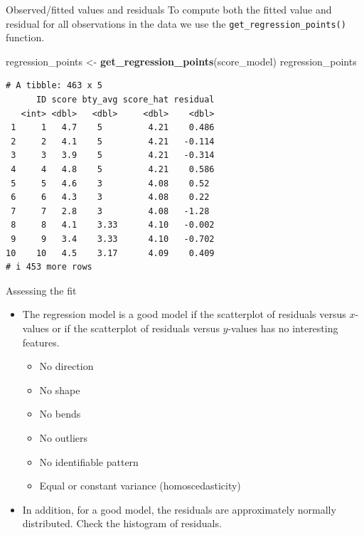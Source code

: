 \documentclass[
  ignorenonframetext,
]{beamer}
\newenvironment{Shaded}{\begin{snugshade}}{\end{snugshade}}
\newcommand{\FunctionTok}[1]{\textcolor[rgb]{0.13,0.29,0.53}{\textbf{#1}}}
\newcommand{\NormalTok}[1]{#1}
\newcommand{\OtherTok}[1]{\textcolor[rgb]{0.56,0.35,0.01}{#1}}
\providecommand{\tightlist}{%
  \setlength{\itemsep}{0pt}\setlength{\parskip}{0pt}}
\begin{document}
\begin{frame}[fragile]{Observed/fitted values and residuals}
\protect{}\label{observedfitted-values-and-residuals-2}
To compute both the fitted value and residual for all observations in
the data we use the \texttt{get\_regression\_points()} function.

\small

\begin{Shaded}
\begin{Highlighting}[]
\NormalTok{regression\_points }\OtherTok{\textless{}{-}} \FunctionTok{get\_regression\_points}\NormalTok{(score\_model)}
\NormalTok{regression\_points}
\end{Highlighting}
\end{Shaded}

\begin{verbatim}
# A tibble: 463 x 5
      ID score bty_avg score_hat residual
   <int> <dbl>   <dbl>     <dbl>    <dbl>
 1     1   4.7    5         4.21    0.486
 2     2   4.1    5         4.21   -0.114
 3     3   3.9    5         4.21   -0.314
 4     4   4.8    5         4.21    0.586
 5     5   4.6    3         4.08    0.52 
 6     6   4.3    3         4.08    0.22 
 7     7   2.8    3         4.08   -1.28 
 8     8   4.1    3.33      4.10   -0.002
 9     9   3.4    3.33      4.10   -0.702
10    10   4.5    3.17      4.09    0.409
# i 453 more rows
\end{verbatim}

\normalsize
\end{frame}

\begin{frame}{Assessing the fit}
\protect{}\label{assessing-the-fit}
\begin{itemize}
\item
  The regression model is a good model if the scatterplot of residuals
  versus \(x\)-values or if the scatterplot of residuals versus
  \(\hat{y}\)-values has no interesting features.

  \begin{itemize}
  \tightlist
  \item
    No direction
  \item
    No shape
  \item
    No bends
  \item
    No outliers
  \item
    No identifiable pattern
  \item
    Equal or constant variance (homoscedasticity)
  \end{itemize}
\item
  In addition, for a good model, the residuals are approximately
  normally distributed. Check the histogram of residuals.
\end{itemize}
\end{frame}
\end{document}
